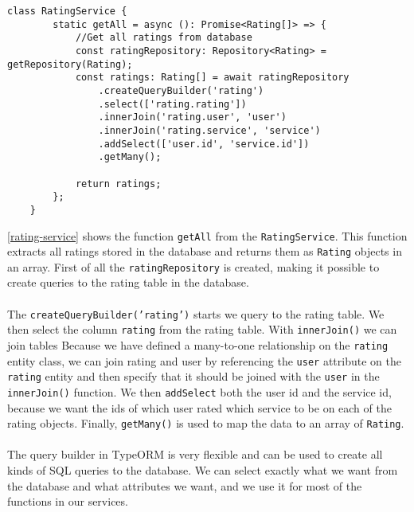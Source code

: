 \begin{lstlisting}[caption={Shows the function used to get get all ratings from the rating service}, captionpos=b, label={rating-service}]
    class RatingService {
        static getAll = async (): Promise<Rating[]> => {
            //Get all ratings from database
            const ratingRepository: Repository<Rating> = getRepository(Rating);
            const ratings: Rating[] = await ratingRepository
                .createQueryBuilder('rating')
                .select(['rating.rating'])
                .innerJoin('rating.user', 'user')
                .innerJoin('rating.service', 'service')
                .addSelect(['user.id', 'service.id'])
                .getMany();
    
            return ratings;
        };
    }
\end{lstlisting}
\autoref{rating-service} shows the function \texttt{getAll} from the \texttt{RatingService}.
This function extracts all ratings stored in the database and returns them as \texttt{Rating} objects in an array.
First of all the \texttt{ratingRepository} is created, making it possible to create queries to the rating table in the database. 
\\\\
The \texttt{createQueryBuilder('rating')} starts we query to the rating table. 
We then select the column \texttt{rating} from the rating table. 
With \texttt{innerJoin()} we can join tables
Because we have defined a many-to-one relationship on the \texttt{rating} entity class, we can join rating and user by referencing the \texttt{user} attribute on the \texttt{rating} entity and then specify that it should be joined with the \texttt{user} in the \texttt{innerJoin()} function. 
We then \texttt{addSelect} both the user id and the service id, because we want the ids of which user rated which service to be on each of the rating objects. 
Finally, \texttt{getMany()} is used to map the data to an array of \texttt{Rating}.
\\\\
The query builder in TypeORM is very flexible and can be used to create all kinds of SQL queries to the database. 
We can select exactly what we want from the database and what attributes we want, and we use it for most of the functions in our services.

